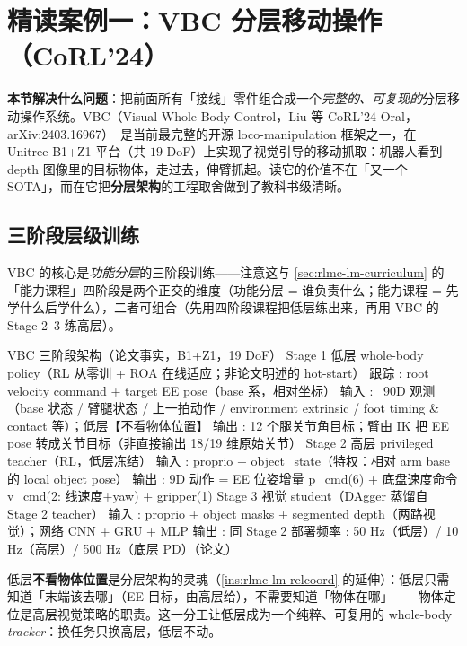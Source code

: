 \section{精读案例一：VBC 分层移动操作（CoRL'24）}
\label{sec:rlmc-lm-vbc}

\textbf{本节解决什么问题}：把前面所有「接线」零件组合成一个\emph{完整的、可复现的}分层移动操作系统。VBC（Visual Whole-Body Control，Liu 等 CoRL'24 Oral，arXiv:2403.16967）\,\cite{liu2024vbc} 是当前最完整的开源 loco-manipulation 框架之一，在 Unitree B1+Z1 平台（共 $19$ DoF）上实现了视觉引导的移动抓取：机器人看到 depth 图像里的目标物体，走过去，伸臂抓起。读它的价值不在「又一个 SOTA」，而在它把\textbf{分层架构}的工程取舍做到了教科书级清晰。

\subsection{三阶段层级训练}
\label{sec:rlmc-lm-vbc-arch}

VBC 的核心是\emph{功能分层}的三阶段训练——注意这与 \cref{sec:rlmc-lm-curriculum} 的「能力课程」四阶段是两个正交的维度（功能分层 = 谁负责什么；能力课程 = 先学什么后学什么），二者可组合（先用四阶段课程把低层练出来，再用 VBC 的 Stage 2--3 练高层）。

\begin{codebox}[text]{VBC 三阶段架构（论文事实，B1+Z1，19 DoF）}
Stage 1  低层 whole-body policy（RL 从零训 + ROA 在线适应；非论文明述的 hot-start）
  跟踪 : root velocity command + target EE pose（base 系，相对坐标）
  输入 : ~90D 观测（base 状态 / 臂腿状态 / 上一拍动作 / environment extrinsic /
         foot timing & contact 等）；低层【不看物体位置】
  输出 : 12 个腿关节角目标；臂由 IK 把 EE pose 转成关节目标（非直接输出 18/19 维原始关节）
Stage 2  高层 privileged teacher（RL，低层冻结）
  输入 : proprio + object_state（特权：相对 arm base 的 local object pose）
  输出 : 9D 动作 = EE 位姿增量 p_cmd(6) + 底盘速度命令 v_cmd(2: 线速度+yaw) + gripper(1)
Stage 3  视觉 student（DAgger 蒸馏自 Stage 2 teacher）
  输入 : proprio + object masks + segmented depth（两路视觉）；网络 CNN + GRU + MLP
  输出 : 同 Stage 2
部署频率 : 50 Hz（低层）/ 10 Hz（高层）/ 500 Hz（底层 PD）（论文）
\end{codebox}

低层\textbf{不看物体位置}是分层架构的灵魂（\cref{ins:rlmc-lm-relcoord} 的延伸）：低层只需知道「末端该去哪」（EE 目标，由高层给），不需要知道「物体在哪」——物体定位是高层视觉策略的职责。这一分工让低层成为一个纯粹、可复用的 whole-body \emph{tracker}：换任务只换高层，低层不动。

